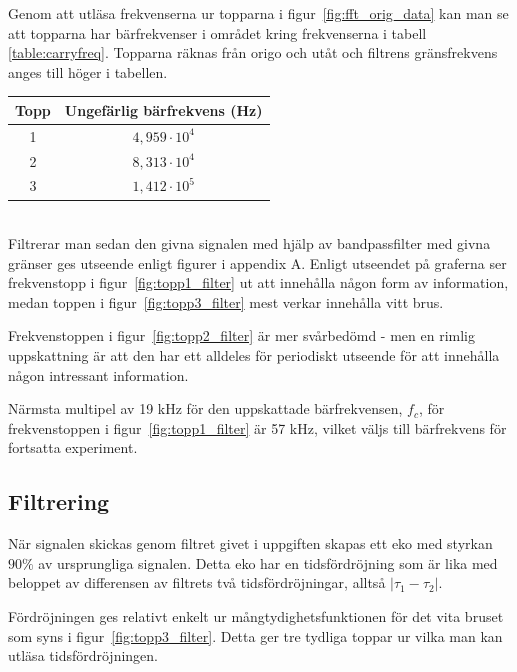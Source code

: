 \documentclass[10pt]{article}
\begin{document}
Genom att utläsa frekvenserna ur topparna i figur~\ref{fig:fft_orig_data} kan man se att topparna har bärfrekvenser i området kring frekvenserna i tabell \ref{table:carryfreq}. Topparna räknas från origo och utåt och filtrens gränsfrekvens anges till höger i tabellen. 
~\\
\begin{center}
\begin{tabular}{c | c }
	\hline
	Topp & Ungefärlig bärfrekvens (Hz) \\ \hline
	1 & $4,959 \cdot 10^4$ \\ \hline
	2 & $8,313 \cdot 10^4$ \\ \hline
	3 & $1,412 \cdot 10^5$ \\ \hline
\end{tabular}
 \label{table:carryfreq}
\end{center}
~\\
Filtrerar man sedan den givna signalen med hjälp av bandpassfilter med givna gränser ges utseende enligt figurer i appendix A. Enligt utseendet på graferna ser frekvenstopp i figur~\ref{fig:topp1_filter} ut att innehålla någon form av information, medan toppen i figur~\ref{fig:topp3_filter} mest verkar innehålla vitt brus. 

Frekvenstoppen i figur~\ref{fig:topp2_filter} är mer svårbedömd - men en rimlig uppskattning är att den har ett alldeles för periodiskt utseende för att innehålla någon intressant information. 

Närmsta multipel av 19 kHz för den uppskattade bärfrekvensen, $f_c$, för frekvenstoppen i figur~\ref{fig:topp1_filter} är 57 kHz, vilket väljs till bärfrekvens för fortsatta experiment. 

\subsection{Filtrering}

När signalen skickas genom filtret givet i uppgiften skapas ett eko med styrkan $90\%$ av ursprungliga signalen. Detta eko har en tidsfördröjning som är lika med beloppet av differensen av filtrets två tidsfördröjningar, alltså $|\tau_1 - \tau_2|$.

Fördröjningen ges relativt enkelt ur mångtydighetsfunktionen för det vita bruset som syns i figur~\ref{fig:topp3_filter}. Detta ger tre tydliga toppar ur vilka man kan utläsa tidsfördröjningen. 
\end{document}

